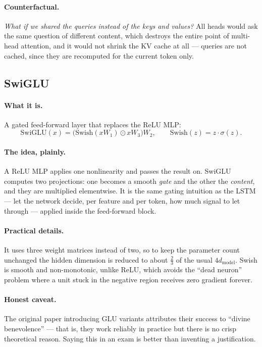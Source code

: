 \documentclass[11pt,a4paper]{article}
\begin{document}
\paragraph{Counterfactual.} \emph{What if we shared the queries instead of the keys and
values?} All heads would ask the same question of different content, which destroys the
entire point of multi-head attention, and it would not shrink the KV cache at all --- queries
are not cached, since they are recomputed for the current token only.

\subsection{SwiGLU}

\paragraph{What it is.} A gated feed-forward layer that replaces the ReLU MLP:
\[
\mathrm{SwiGLU}(x) = \big(\mathrm{Swish}(xW_1) \odot xW_3\big)W_2,
\qquad \mathrm{Swish}(z) = z \cdot \sigma(z).
\]

\paragraph{The idea, plainly.} A ReLU MLP applies one nonlinearity and passes the result on.
SwiGLU computes two projections: one becomes a smooth \emph{gate} and the other the
\emph{content}, and they are multiplied elementwise. It is the same gating intuition as the
LSTM --- let the network decide, per feature and per token, how much signal to let through
--- applied inside the feed-forward block.

\paragraph{Practical details.} It uses three weight matrices instead of two, so to keep the
parameter count unchanged the hidden dimension is reduced to about $\frac{2}{3}$ of the usual
$4 d_{\text{model}}$. Swish is smooth and non-monotonic, unlike ReLU, which avoids the ``dead
neuron'' problem where a unit stuck in the negative region receives zero gradient forever.

\paragraph{Honest caveat.} The original paper introducing GLU variants attributes their
success to ``divine benevolence'' --- that is, they work reliably in practice but there is no
crisp theoretical reason. Saying this in an exam is better than inventing a justification.
\end{document}
